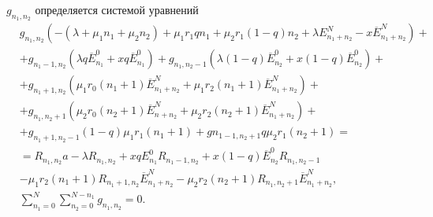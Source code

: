 $g_{n_1, n_2}$ определяется системой уравнений
\begin{equation*}\label{sistemG}
	\begin{split}
		&g_{n_{1}, n_{2}}(-(\lambda +\mu_{1} n_{1}+\mu_{2} n_{2})+\mu_{1} r_{1} q n_{1}+ \mu_{2} r_{1} (1-q) n_{2} + \lambda E_{n_{1} + n_{2}}^{N} - x\overline{E}_{n_{1} + n_{2}}^{N})+\\
		&+g_{n_{1}-1, n_{2}}(\lambda q \overline{E}_{n_{1}}^{0}+xq\overline{E}_{n_{1}}^{0})+g_{n_{1}, n_{2}-1}(\lambda (1-q) \overline{E}_{n_{2}}^{0}+x(1-q)\overline{E}_{n_{2}}^{0})+\\
		&+g_{n_{1}+1, n_{2}}(\mu_{1} r_{0}(n_{1}+1)\overline{E}_{n_{1} + n_{2}}^{N} + \mu_{1} r_{2}(n_{1}+1)\overline{E}_{n_{1} + n_{2}}^{N})+\\
		&+g_{n_{1}, n_{2}+1}(\mu_{2} r_{0}(n_{2}+1)\overline{E}_{n_{} + n_{2}}^{N} + \mu_{2} r_{2}(n_{2}+1)\overline{E}_{n_{1} + n_{2}}^{N})+\\
		&+g_{n_{1}+1, n_{2}-1}(1-q)\mu_{1} r_{1} (n_{1}+1)+g{n_{1-1, n_{2}+1}}q\mu_{2}r_{1}(n_{2}+1)=\\
		&=R_{n_{1}, n_{2}}a-\lambda R_{n_{1}, n_{2}} +x q E_{n_{1}}^{0} R_{n_{1}-1, n_{2}}+x (1-q) \overline{E}_{n_{2}}^{0} R_{n_{1}, n_{2}-1}\\
		&-\mu_{1}r_{2}(n_{1}+1)R_{n_{1}+1, n_{2}}\overline{E}_{n_{1} + n_{2}}^{N}-\mu_{2}r_{2}(n_{2}+1)R_{n_{1}, n_{2}+1}\overline{E}_{n_{1} + n_{2}}^{N},\\
		&\sum_{n_{1}=0}^{N}\sum_{n_{2}=0}^{N-n_{1}}g_{n_{1}, n_{2}}=0.
	\end{split}
\end{equation*}

